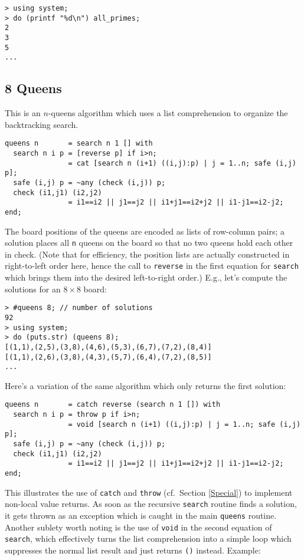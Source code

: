 \documentclass[a4paper,12pt]{article}
\begin{document}
\begin{lstlisting}
> using system;
> do (printf "%d\n") all_primes;
2
3
5
...
\end{lstlisting}

\subsection{8 Queens}
\label{Queens}

This is an $n$-queens algorithm which uses a list comprehension to organize
the backtracking search.

\pagebreak[2]

\begin{lstlisting}
queens n       = search n 1 [] with
  search n i p = [reverse p] if i>n;
               = cat [search n (i+1) ((i,j):p) | j = 1..n; safe (i,j) p];
  safe (i,j) p = ~any (check (i,j)) p;
  check (i1,j1) (i2,j2)
               = i1==i2 || j1==j2 || i1+j1==i2+j2 || i1-j1==i2-j2;
end;
\end{lstlisting}

The board positions of the queens are encoded as lists of row-column pairs; a
solution places all \verb|n| queens on the board so that no two queens hold
each other in check. (Note that for efficiency, the position lists are
actually constructed in right-to-left order here, hence the call to
\texttt{reverse} in the first equation for \texttt{search} which brings them
into the desired left-to-right order.) E.g., let's compute the solutions for
an $8\times 8$ board:

\begin{lstlisting}
> #queens 8; // number of solutions
92
> using system;
> do (puts.str) (queens 8);
[(1,1),(2,5),(3,8),(4,6),(5,3),(6,7),(7,2),(8,4)]
[(1,1),(2,6),(3,8),(4,3),(5,7),(6,4),(7,2),(8,5)]
...
\end{lstlisting}

Here’s a variation of the same algorithm which only returns the first
solution:

\begin{lstlisting}
queens n       = catch reverse (search n 1 []) with
  search n i p = throw p if i>n;
               = void [search n (i+1) ((i,j):p) | j = 1..n; safe (i,j) p];
  safe (i,j) p = ~any (check (i,j)) p;
  check (i1,j1) (i2,j2)
               = i1==i2 || j1==j2 || i1+j1==i2+j2 || i1-j1==i2-j2;
end;
\end{lstlisting}

This illustrates the use of \verb|catch| and \verb|throw| (cf.\ Section
\ref{Special}) to implement non-local value returns. As soon as the recursive
\verb|search| routine finds a solution, it gets thrown as an exception which
is caught in the main \verb|queens| routine. Another sublety worth noting is
the use of \verb|void| in the second equation of \verb|search|, which
effectively turns the list comprehension into a simple loop which suppresses
the normal list result and just returns \verb|()| instead. Example:
\end{document}

